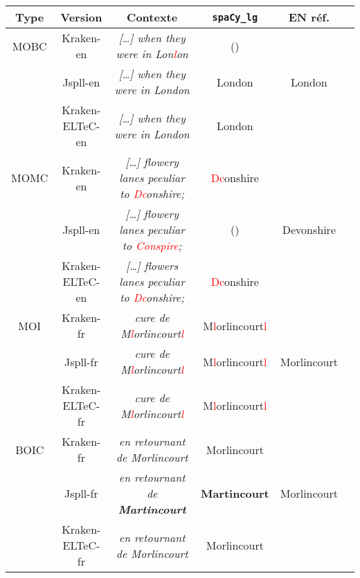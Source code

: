 
\begin{tabular}{|c|c|c|c|c|c|}
\hline
Type &Version & Contexte & \texttt{spaCy\_lg} & EN réf.\\
\hline
MOBC &Kraken-en &\textit{[…] when they were in Lon\textcolor{red}{l}on}&() & \\
&Jspll-en&\textit{[…] when they were in London}&London & London \\
&Kraken-ELTeC-en&\textit{[…] when they were in London}&London & \\
\hline
MOMC& Kraken-en&\textit{[…] flowery
lanes peeuliar to \textcolor{red}{Dc}onshire;}&\textcolor{red}{Dc}onshire & \\
&Jspll-en&\textit{[…] flowery
lanes peculiar to \textcolor{red}{Conspire};}&() & Devonshire\\
&Kraken-ELTeC-en&\textit{[…] flowers
lanes peculiar to \textcolor{red}{Dc}onshire;}&\textcolor{red}{Dc}onshire &\\
\hline
MOI&Kraken-fr& \textit{cure de M\textcolor{red}{l}orlincourt\textcolor{red}{l}}& M\textcolor{red}{l}orlincourt\textcolor{red}{l} &\\
&Jspll-fr&\textit{cure de  M\textcolor{red}{l}orlincourt\textcolor{red}{l}} &   M\textcolor{red}{l}orlincourt\textcolor{red}{l} & Morlincourt\\
&Kraken-ELTeC-fr& \textit{cure de  M\textcolor{red}{l}orlincourt\textcolor{red}{l}}&  M\textcolor{red}{l}orlincourt\textcolor{red}{l} &  \\
\hline
BOIC&Kraken-fr& \textit{en retournant
de Morlincourt} &Morlincourt & \\
&Jspll-fr&\textit{en retournant
de\textbf{ Martincourt}} & \textbf{Martincourt} & Morlincourt\\
&Kraken-ELTeC-fr&\textit{en retournant
de Morlincourt} &Morlincourt & \\
\hline
\end{tabular}

